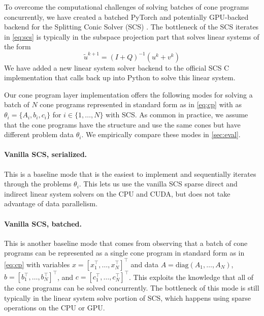 To overcome the computational challenges of solving batches
of cone programs concurrently, we have created a batched
PyTorch and potentially GPU-backed backend for the
Splitting Conic Solver (SCS) \citep{odonoghue2016conic}.
The bottleneck of the SCS iterates in \cref{eq:scs}
is typically in the subspace projection part that solves
linear systems of the form
\begin{equation}
  \tilde u^{k+1} = (I + Q)^{-1} (u^k + v^k )
\end{equation}
We have added a new linear system solver backend to the
official SCS C implementation that calls back
up into Python to solve this linear system.

Our cone program layer implementation offers the following
modes for solving a batch of $N$ cone programs
represented in standard form as in \cref{eq:cp} with
as $\theta_i=\{A_i, b_i, c_i\}$
for $i\in\{1, \ldots, N\}$ with SCS.
As common in practice, we assume that the cone programs
have the structure and use the same cones but have
different problem data $\theta_i$.
We empirically compare these modes in \cref{sec:eval}.

\paragraph{Vanilla SCS, serialized.}
This is a baseline mode that is the easiest to implement and sequentially
iterates through the problems $\theta_i$.
This lets us use the vanilla SCS sparse direct and indirect
linear system solvers on the CPU and CUDA, but does
not take advantage of data parallelism.

\paragraph{Vanilla SCS, batched.}
This is another baseline mode that comes from observing that a
batch of cone programs can be represented as
a single cone program in standard form as in \cref{eq:cp} with
variables $x=[x_1^\top, \ldots, x_N^\top]^\top$
and data $A=\mathrm{diag}(A_1, \ldots, A_N)$,
$b=[b_1^\top, \ldots, b_N^\top]^\top$,
and $c=[c_1^\top, \ldots, c_N^\top]^\top$.
This exploits the knowledge that all of the cone programs
can be solved concurrently. The bottleneck of this
mode is still typically in the linear system solve
portion of SCS, which happens using sparse operations
on the CPU or GPU.

